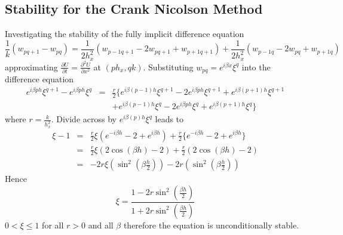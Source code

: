 \subsection{Stability for the Crank Nicolson Method}
Investigating the stability of the fully implicit difference equation
\[\frac{1}{k}(w_{pq+1}-w_{pq})=\frac{1}{2h_x^2}(w_{p-1q+1}-2w_{pq+1}+w_{p+1q+1})+\frac{1}{2h_x^2}(w_{p-1q}-2w_{pq}+w_{p+1q})\]
approximating $\frac{\partial U}{\partial t}=\frac{\partial^2 U}{\partial x^2}$ at $(ph_x,qk)$. Substituting $w_{pq}=e^{i\beta x}\xi^{q}$ into the difference equation
\begin{eqnarray*}e^{i\beta ph}\xi^{q+1}-e^{i\beta ph}\xi^{q}&=&
\frac{r}{2} \{
e^{i\beta (p-1)h}\xi^{q+1}
-2e^{i\beta ph}\xi^{q+1}
+
e^{i\beta (p+1)h}\xi^{q+1}\\
 & & +
e^{i\beta (p-1)h}\xi^{q}
-2e^{i\beta ph}\xi^{q}
+
e^{i\beta (p+1)h}\xi^{q}
 \}
\end{eqnarray*}
where $r=\frac{k}{h_x^2}$. Divide across by $e^{i\beta (p)h}\xi^{q}$ leads to
\begin{eqnarray*} \xi-1&=&\frac{r}{2}\xi(e^{-i\beta h}
-2
+
e^{i\beta h})+\frac{r}{2}\{
e^{-i\beta h}
-2
+
e^{i\beta h}
 \}\\
&=& \frac{r}{2} \xi(2\cos(\beta h)-2)+\frac{r}{2} (2\cos(\beta h)-2)\\
&=&-2r\xi(\sin^2(\beta\frac{h}{2}))-2r(\sin^2(\beta\frac{h}{2}))
\end{eqnarray*}
Hence \[\xi = \frac{1-2r\sin^2(\frac{\beta h}{2})}{1+2r\sin^2(\frac{\beta h}{2})}\]
$0 < \xi \leq 1$ for all $r>0$ and all $\beta$ therefore the equation is unconditionally stable.

